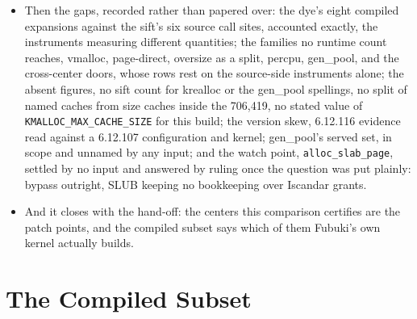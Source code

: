 \documentclass[11pt]{article}
\begin{document}
\begin{itemize}
\item Then the gaps, recorded rather than papered over: the dye's eight compiled expansions against the sift's six source call sites, accounted exactly, the instruments measuring different quantities; the families no runtime count reaches, vmalloc, page-direct, oversize as a split, percpu, gen\_pool, and the cross-center doors, whose rows rest on the source-side instruments alone; the absent figures, no sift count for krealloc or the gen\_pool spellings, no split of named caches from size caches inside the 706,419, no stated value of \texttt{KMALLOC\_MAX\_CACHE\_SIZE} for this build; the version skew, 6.12.116 evidence read against a 6.12.107 configuration and kernel; gen\_pool's served set, in scope and unnamed by any input; and the watch point, \texttt{alloc\_slab\_page}, settled by no input and answered by ruling once the question was put plainly: bypass outright, SLUB keeping no bookkeeping over Iscandar grants.
\item And it closes with the hand-off: the centers this comparison certifies are the patch points, and the compiled subset says which of them Fubuki's own kernel actually builds.
\end{itemize}

\section{The Compiled Subset}
\end{document}
